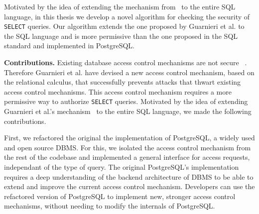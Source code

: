 Motivated by the idea of extending the mechanism from~\cite{guarnieri2016strong} to the entire SQL language, in this thesis we develop a novel algorithm for checking the security of \texttt{SELECT} queries.
%
Our algorithm extends the one proposed by Guarnieri et al. to the SQL language and is more permissive than the one proposed in the SQL standard and  implemented in PostgreSQL.

\smallskip
\noindent
{\bf Contributions.}
Existing database access control mechanisms are not secure~\cite{guarnieri2016strong} . 
%
Therefore Guarnieri et al. have devised a new access control mechanism, based on the relational calculus, that successfully prevents attacks that thwart existing access control mechanisms.
%
This access control mechanism requires a more permissive way to authorize \texttt{SELECT} queries.
%
Motivated by the idea of extending Guarnieri et al.'s mechanism~\cite{guarnieri2016strong} to the entire SQL language,  we made the following contributions.

First, we refactored the original the implementation of PostgreSQL, a widely used and open source DBMS.
%
For this, we isolated the access control mechanism from the rest of the codebase and implemented a general interface for access requests, independant of the type of query. 
%
The original PostgreSQL's implementation requires a deep understanding of the backend architecture of DBMS to be able to extend and improve the current access control mechanism.
%
Developers can use the refactored version of PostgreSQL to implement new, stronger access control mechanisms, without needing to modify the internals of PostgreSQL.



